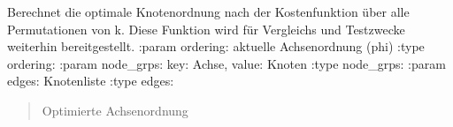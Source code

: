 \documentclass[a4paper,10pt,ngerman]{sphinxmanual}
\begin{document}
\begin{fulllineitems}
\label{\detokenize{api:src.ordering.brute_force_ordering}}
\pysigstartsignatures
\pysiglinewithargsret
{}
{\sphinxparamcomma {}\sphinxparamcomma {}}
{}
\pysigstopsignatures
\sphinxAtStartPar
Berechnet die optimale Knotenordnung nach der Kostenfunktion über alle Permutationen von k.
Diese Funktion wird für Vergleichs\sphinxhyphen{} und Testzwecke weiterhin bereitgestellt.
:param ordering: aktuelle Achsenordnung (phi)
:type ordering: 
:param node\_grps: key: Achse, value: Knoten
:type node\_grps: 
:param edges: Knotenliste
:type edges: 
\begin{quote}\begin{description}
\sphinxAtStartPar
Optimierte Achsenordnung

\sphinxAtStartPar
{}

\end{description}\end{quote}

\end{fulllineitems}


\begin{fulllineitems}
\label{\detokenize{api:src.ordering.ip_ordering}}
\pysigstartsignatures
\pysiglinewithargsret
{}
{}
{}
\pysigstopsignatures\begin{quote}\begin{description}
\sphinxAtStartPar
{}

\end{description}\end{quote}

\end{fulllineitems}
\end{document}
